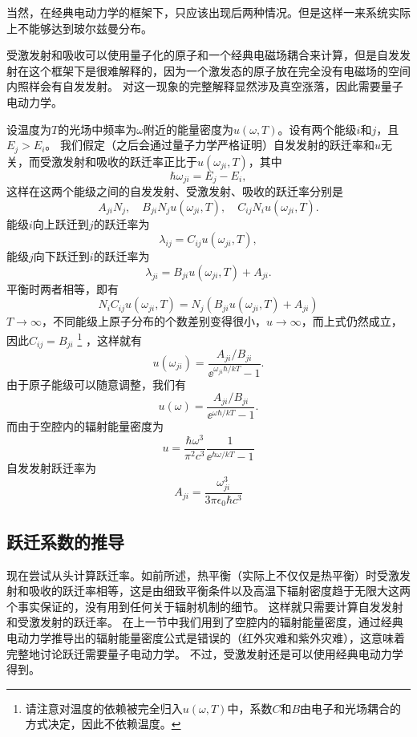 当然，在经典电动力学的框架下，只应该出现后两种情况。但是这样一来系统实际上不能够达到玻尔兹曼分布。

受激发射和吸收可以使用量子化的原子和一个经典电磁场耦合来计算，但是自发发射在这个框架下是很难解释的，因为一个激发态的原子放在完全没有电磁场的空间内照样会有自发发射。
对这一现象的完整解释显然涉及真空涨落，因此需要量子电动力学。

设温度为$T$的光场中频率为$\omega$附近的能量密度为$u(\omega, T)$。设有两个能级$i$和$j$，且$E_j > E_i$。
我们假定（之后会通过量子力学严格证明）自发发射的跃迁率和$u$无关，而受激发射和吸收的跃迁率正比于$u(\omega_{ji}, T)$，其中
\begin{equation}
    \hbar \omega_{ji} = E_j - E_i,
    \label{eq:photon-energy}
\end{equation}
这样在这两个能级之间的自发发射、受激发射、吸收的跃迁率分别是
\[
    A_{ji} N_j, \quad B_{ji} N_j u(\omega_{ji}, T), \quad C_{ij} N_i u(\omega_{ji}, T).
\]
能级$i$向上跃迁到$j$的跃迁率为
\[
    \lambda_{ij} = C_{ij} u(\omega_{ji}, T),
\]
能级$j$向下跃迁到$i$的跃迁率为
\[
    \lambda_{ji} = B_{ji} u(\omega_{ji}, T) + A_{ji}.
\]
平衡时两者相等，即有
\[
    N_i C_{ij} u(\omega_{ji}, T) = N_j (B_{ji} u(\omega_{ji}, T) + A_{ji})
\]
$T \to \infty$，不同能级上原子分布的个数差别变得很小，$u \to \infty$，而上式仍然成立，因此$C_{ij} = B_{ji}$%
\footnote{请注意对温度的依赖被完全归入$u(\omega, T)$中，系数$C$和$B$由电子和光场耦合的方式决定，因此不依赖温度。}%
，这样就有
\[
    u(\omega_{ji}) = \frac{A_{ji} / B_{ji}}{\ee^{\omega_{ji} \hbar / k T} - 1}.
\]
由于原子能级可以随意调整，我们有
\[
    u(\omega) = \frac{A_{ji} / B_{ji}}{\ee^{\omega \hbar / k T} - 1}.
\]
而由于空腔内的辐射能量密度为
\[
    u = \frac{\hbar \omega^3}{\pi^2 c^3} \frac{1}{\ee^{\hbar \omega / kT} - 1}
\]
自发发射跃迁率为
\[
    A_{ji} = \frac{\omega_{ji}^3}{3\pi \epsilon_0 \hbar c^3}
\]

\subsection{跃迁系数的推导}\label{sec:electro-dipole-hopping}

现在尝试从头计算跃迁率。如前所述，热平衡（实际上不仅仅是热平衡）时受激发射和吸收的跃迁率相等，这是由细致平衡条件以及高温下辐射密度趋于无限大这两个事实保证的，没有用到任何关于辐射机制的细节。
这样就只需要计算自发发射和受激发射的跃迁率。
在上一节中我们用到了空腔内的辐射能量密度，通过经典电动力学推导出的辐射能量密度公式是错误的（红外灾难和紫外灾难），这意味着完整地讨论跃迁需要量子电动力学。
不过，受激发射还是可以使用经典电动力学得到。

